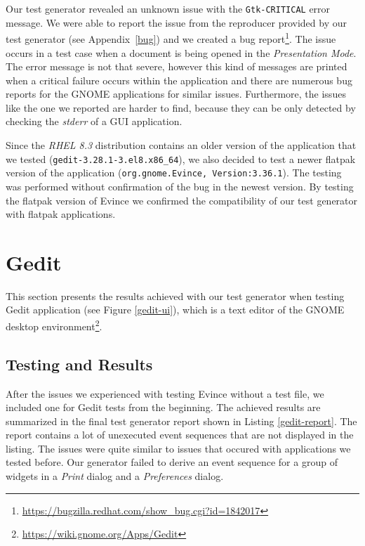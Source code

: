 Our test generator revealed an unknown issue with the \texttt{Gtk-CRITICAL} error message. We were able to report the issue from the reproducer provided by our test generator (see Appendix~\ref{bug}) and we created a bug report\footnote{\url{https://bugzilla.redhat.com/show_bug.cgi?id=1842017}}. The issue occurs in a test case when a document is being opened in the \textit{Presentation Mode}. The error message is not that severe, however this kind of messages are printed when a critical failure occurs within the application and there are numerous bug reports for the GNOME applications for similar issues. Furthermore, the issues like the one we reported are harder to find, because they can be only detected by checking the \textit{stderr} of a GUI application.

Since the \textit{RHEL 8.3} distribution contains an older version of the application that we tested (\texttt{gedit-3.28.1-3.el8.x86\_64}), we also decided to test a newer flatpak version of the application (\texttt{org.gnome.Evince, Version:3.36.1}). The testing was performed without confirmation of the bug in the newest version. By testing the flatpak version of Evince we confirmed the compatibility of our test generator with flatpak applications.  




\section{Gedit}\label{gedit}
This section presents the results achieved with our test generator when testing Gedit application (see Figure \ref{gedit-ui}), which is a text editor of the GNOME desktop environment\footnote{\url{https://wiki.gnome.org/Apps/Gedit}}. 


\subsection*{Testing and Results}
After the issues we experienced with testing Evince without a test file, we included one for Gedit tests from the beginning. The achieved results are summarized in the final test generator report shown in Listing \ref{gedit-report}. The report contains a lot of unexecuted event sequences that are not displayed in the listing. The issues were quite similar to issues that occured with applications we tested before. Our generator failed to derive an event sequence for a group of widgets in a \textit{Print} dialog and a \textit{Preferences} dialog.


